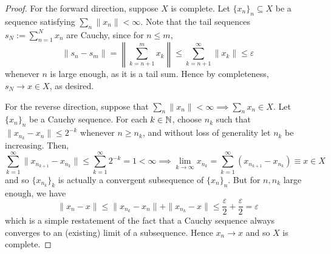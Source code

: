 \begin{proof}
    For the forward direction, suppose \(X\) is complete. Let \(\{x_n\}_n \subseteq X\) be a sequence satisfying \(\sum_n \|x_n\| < \infty\). Note that the tail sequences \(s_N := \sum_{n=1}^N x_n\) are Cauchy, since for \(n \leq m\), 
    \[
        \|s_n - s_m\|
        = \left\| \sum_{k=n+1}^m x_k \right\|
        \leq \sum_{k=n+1}^\infty \|x_k\|
        \leq \varepsilon
    \]
    whenever \(n\) is large enough, as it is a tail sum. Hence by completeness, \(s_N \to x \in X\), as desired. 
    \stdvspace

    For the reverse direction, suppose that \(\sum_n \|x_n\| < \infty \implies \sum_n x_n \in X\). Let \(\{x_n\}_n\) be a Cauchy sequence. For each \(k \in \mathbb{N}\), choose \(n_k\) such that \(\|x_{n_k} - x_n\| \leq 2^{-k}\) whenever \(n \geq n_k\), and without loss of generality let \(n_k\) be increasing. Then,
    \[
        \sum_{k=1}^\infty \|x_{n_{k+1}} - x_{n_k}\|
        \leq \sum_{k=1}^\infty 2^{-k} 
        = 1 
        < \infty
        \implies 
        \lim_{k \to \infty} x_{n_k} = \sum_{k=1}^\infty (x_{n_{k+1}} - x_{n_k}) 
        \equiv x \in X
    \]
    and so \(\{x_{n_k}\}_k\) is actually a convergent subsequence of \(\{x_n\}_n\). But for \(n, n_k\) large enough, we have 
    \[
        \|x_n - x\| \leq \|x_{n_k} - x_n\| + \|x_{n_k} - x\| \leq \frac{\varepsilon}{2} + \frac{\varepsilon}{2} = \varepsilon
    \]
    which is a simple restatement of the fact that a Cauchy sequence always converges to an (existing) limit of a subsequence. Hence \(x_n \to x\) and so \(X\) is complete. 
\end{proof}


